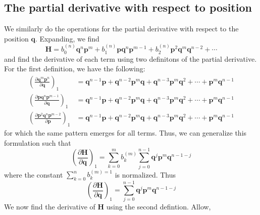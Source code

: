 \documentclass[a4paper]{article}
\theoremstyle{definition}
\begin{document}
		\subsection{The partial derivative with respect to position}
		We similarly do the operations for the partial derivative with respect to the position $\textbf{q}$.
		Expanding, we find
		\begin{equation}
			\textbf{H}=b_0^{(n)}\textbf{q}^n\textbf{p}^m+b_1^{(n)}\textbf{p}\textbf{q}^n\textbf{p}^{m-1}+b_2^{(n)}\textbf{p}^2\textbf{q}^m\textbf{q}^{n-2}+\cdots
		\end{equation}
		and find the derivative of each term using two definitons of the partial derivative. For the first definition, we have the following:
		\begin{align}
			\left(\frac{\partial\textbf{q}^m\textbf{p}^n}{\partial\textbf{q}}\right)_1&=\textbf{q}^{n-1}\textbf{p}+\textbf{q}^{n-2}\textbf{p}^m\textbf{q}+\textbf{q}^{n-3}\textbf{p}^m\textbf{q}^{2}+\cdots+\textbf{p}^m\textbf{q}^{n-1} \\
			\left(\frac{\partial\textbf{p}\textbf{q}^n\textbf{p}^{m-1}}{\partial\textbf{q}}\right)_1&=\textbf{q}^{n-1}\textbf{p}+\textbf{q}^{n-2}\textbf{p}^m\textbf{q}+\textbf{q}^{n-3}\textbf{p}^m\textbf{q}^{2}+\cdots+\textbf{p}^m\textbf{q}^{n-1} \\
			\left(\frac{\partial\textbf{p}^2\textbf{q}^n\textbf{p}^{m-2}}{\partial\textbf{p}}\right)_1&=\textbf{q}^{n-1}\textbf{p}+\textbf{q}^{n-2}\textbf{p}^m\textbf{q}+\textbf{q}^{n-3}\textbf{p}^m\textbf{q}^{2}+\cdots+\textbf{p}^m\textbf{q}^{n-1}
		\end{align}
		for which the same pattern emerges for all terms. Thus, we can generalize this formulation such that
		\begin{equation}
			\left( \frac{\partial\textbf{H}}{\partial\textbf{q}}\right)_1=\sum_{k=0}^mb_k^{(m)}\sum_{j=0}^{n-1}\textbf{q}^j\textbf{p}^m\textbf{q}^{n-1-j}
		\end{equation}
		where the constant $\sum_{k=0}^nb_k^{(m)=1}$ is normalized. Thus
		\begin{equation}
			\left( \frac{\partial\textbf{H}}{\partial\textbf{q}}\right)_1=\sum_{j=0}^{n-1}\textbf{q}^j\textbf{p}^m\textbf{q}^{n-1-j}
		\end{equation}
		We now find the derivative of $\textbf{H}$ using the second defintion. Allow,
\end{document}
